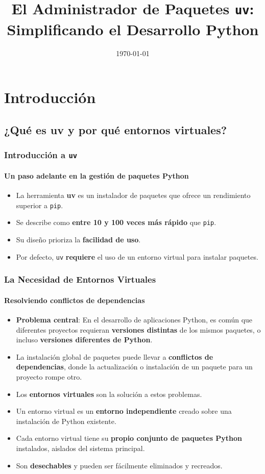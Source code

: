 \documentclass{beamer}
\title{El Administrador de Paquetes \texttt{uv}: Simplificando el Desarrollo Python}
\date{\today}
\begin{document}
\frame{\titlepage}

\section{Introducción}
\subsection{¿Qué es uv y por qué entornos virtuales?}
\frame
{
    \frametitle{Introducción a \texttt{uv}}
    \framesubtitle{Un paso adelante en la gestión de paquetes Python}
    \begin{itemize}
        \item La herramienta \textbf{uv} es un instalador de paquetes que ofrece un rendimiento superior a \texttt{pip}.
        \item Se describe como \textbf{entre 10 y 100 veces más rápido} que \texttt{pip}.
        \item Su diseño prioriza la \textbf{facilidad de uso}.
        \item Por defecto, \texttt{uv} \textbf{requiere} el uso de un entorno virtual para instalar paquetes.
    \end{itemize}
}

\frame
{
    \frametitle{La Necesidad de Entornos Virtuales}
    \framesubtitle{Resolviendo conflictos de dependencias}
    \begin{itemize}
        \item \textbf{Problema central}: En el desarrollo de aplicaciones Python, es común que diferentes proyectos requieran \textbf{versiones distintas} de los mismos paquetes, o incluso \textbf{versiones diferentes de Python}.
        \item La instalación global de paquetes puede llevar a \textbf{conflictos de dependencias}, donde la actualización o instalación de un paquete para un proyecto rompe otro.
        \item Los \textbf{entornos virtuales} son la solución a estos problemas.
        \item Un entorno virtual es un \textbf{entorno independiente} creado sobre una instalación de Python existente.
        \item Cada entorno virtual tiene su \textbf{propio conjunto de paquetes Python} instalados, aislados del sistema principal.
        \item Son \textbf{desechables} y pueden ser fácilmente eliminados y recreados.
    \end{itemize}
}
\end{document}
